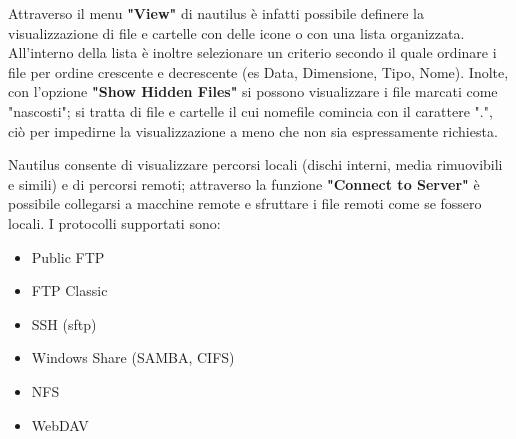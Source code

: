 Attraverso il menu \textbf{"View"} di nautilus è  infatti possibile definere la visualizzazione di file e cartelle con delle icone o con una lista organizzata. 
All'interno della lista è inoltre selezionare un criterio secondo il quale ordinare i file per ordine crescente e decrescente (es Data, Dimensione, Tipo, Nome). Inolte, con l'opzione \textbf{"Show Hidden Files"} si possono visualizzare i file marcati come "nascosti"; si tratta di file e cartelle il cui nomefile comincia con il carattere ".", ciò per impedirne la visualizzazione a meno che non sia espressamente richiesta. 

Nautilus consente di visualizzare percorsi locali (dischi interni, media rimuovibili e simili) e di percorsi remoti; attraverso la funzione \textbf{"Connect to Server"} è possibile collegarsi a macchine remote e sfruttare i file remoti come se fossero locali. I protocolli supportati sono:

\begin{itemize}
 \item Public FTP
 \item FTP Classic
 \item SSH (sftp)
 \item Windows Share (SAMBA, CIFS)
 \item NFS
 \item WebDAV
\end{itemize}

